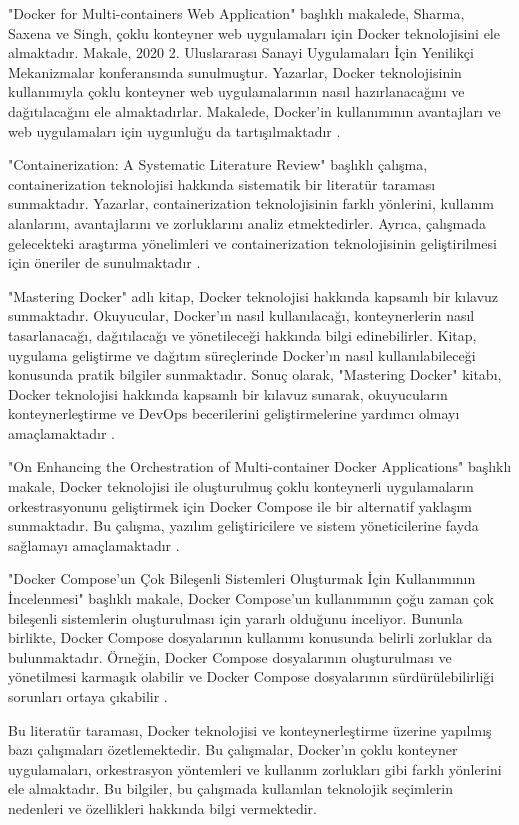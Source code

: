 "Docker for Multi-containers Web Application" başlıklı makalede, Sharma, Saxena ve Singh, çoklu konteyner web uygulamaları için Docker teknolojisini ele almaktadır. Makale, 2020 2. Uluslararası Sanayi Uygulamaları İçin Yenilikçi Mekanizmalar konferansında sunulmuştur. Yazarlar, Docker teknolojisinin kullanımıyla çoklu konteyner web uygulamalarının nasıl hazırlanacağını ve dağıtılacağını ele almaktadırlar. Makalede, Docker'in kullanımının avantajları ve web uygulamaları için uygunluğu da tartışılmaktadır \cite{sharma2020docker}.

"Containerization: A Systematic Literature Review" başlıklı çalışma, containerization teknolojisi hakkında sistematik bir literatür taraması sunmaktadır. Yazarlar, containerization teknolojisinin farklı yönlerini, kullanım alanlarını, avantajlarını ve zorluklarını analiz etmektedirler. Ayrıca, çalışmada gelecekteki araştırma yönelimleri ve containerization teknolojisinin geliştirilmesi için öneriler de sunulmaktadır \cite{Brown_Jennifer}.

"Mastering Docker" adlı kitap, Docker teknolojisi hakkında kapsamlı bir kılavuz sunmaktadır. Okuyucular, Docker'ın nasıl kullanılacağı, konteynerlerin nasıl tasarlanacağı, dağıtılacağı ve yönetileceği hakkında bilgi edinebilirler. Kitap, uygulama geliştirme ve dağıtım süreçlerinde Docker'ın nasıl kullanılabileceği konusunda pratik bilgiler sunmaktadır. Sonuç olarak, "Mastering Docker" kitabı, Docker teknolojisi hakkında kapsamlı bir kılavuz sunarak, okuyucuların konteynerleştirme ve DevOps becerilerini geliştirmelerine yardımcı olmayı amaçlamaktadır \cite{mckendrick2020mastering}.

"On Enhancing the Orchestration of Multi-container Docker Applications" başlıklı makale, Docker teknolojisi ile oluşturulmuş çoklu konteynerli uygulamaların orkestrasyonunu geliştirmek için Docker Compose ile bir alternatif yaklaşım sunmaktadır. Bu çalışma, yazılım geliştiricilere ve sistem yöneticilerine fayda sağlamayı amaçlamaktadır \cite{brogi2020enhancing}.

"Docker Compose'un Çok Bileşenli Sistemleri Oluşturmak İçin Kullanımının İncelenmesi" başlıklı makale, Docker Compose'un kullanımının çoğu zaman çok bileşenli sistemlerin oluşturulması için yararlı olduğunu inceliyor. Bununla birlikte, Docker Compose dosyalarının kullanımı konusunda belirli zorluklar da bulunmaktadır. Örneğin, Docker Compose dosyalarının oluşturulması ve yönetilmesi karmaşık olabilir ve Docker Compose dosyalarının sürdürülebilirliği sorunları ortaya çıkabilir \cite{ibrahim2021study}.

Bu literatür taraması, Docker teknolojisi ve konteynerleştirme üzerine yapılmış bazı çalışmaları özetlemektedir. Bu çalışmalar, Docker'ın çoklu konteyner uygulamaları, orkestrasyon yöntemleri ve kullanım zorlukları gibi farklı yönlerini ele almaktadır. Bu bilgiler, bu çalışmada kullanılan teknolojik seçimlerin nedenleri ve özellikleri hakkında bilgi vermektedir.